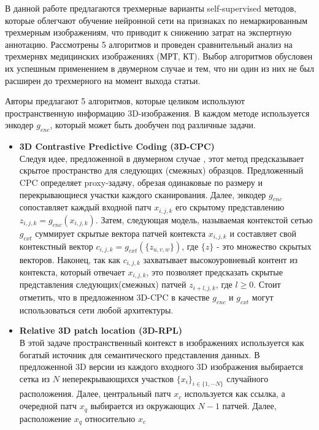 В данной работе \cite{3DSelfSuper} предлагаются трехмерные варианты self-supervised 
методов, которые облегчают обучение нейронной сети на признаках 
по немаркированным трехмерным изображениям, что приводит к снижению
затрат на экспертную аннотацию. Рассмотрены 5 алгоритмов и проведен 
сравнительный анализ на трехмернвх медицинских изображениях (МРТ, КТ).
Выбор алгоритмов обусловен их успешным применением в двумерном случае и тем,
что ни один из них не был расширен до трехмерного на момент выхода статьи.

\par 
Авторы предлагают 5 алгоритмов, которые целиком используют пространственную информацию
3D-изображения. В каждом методе используется энкодер \(g_{enc}\), который 
может быть дообучен под различные задачи.
\begin{itemize}
    \item \textbf{3D Contrastive Predictive Coding (3D-CPC)} \\
    Следуя идее, предложенной в двумерном случае \cite{CPC}, этот метод предсказывает скрытое 
    пространство для следующих (смежных) образцов. Предложенный CPC определяет 
    proxy-задачу, обрезая одинаковые по размеру и перекрывающиеся участки каждого 
    сканирования. Далее, энкодер \(g_{enc}\) сопоставляет каждый входной патч 
    \(x_{i,j,k}\) его скрытому представлению \(z_{i,j,k}= g_{enc}(x_{i,j,k})\). Затем, 
    следующая модель, называемая контекстой сетью \(g_{cxt}\) суммирует скрытые вектора патчей
    контекста \(x_{i,j,k}\) и составляет свой контекстный вектор 
    \(c_{i,j,k}=g_{cxt}(\{z_{u,v,w}\})\), где \(\{z\}\) - это множество скрытых векторов.
    Наконец, так как \(c_{i,j,k}\) захватывает высокоуровневый контент из контекста, который 
    отвечает \(x_{i,j,k}\), это позволяет предсказать скрытые представления следующих(смежных)
    патчей \(z_{i+l,j,k}\), где \(l\geq 0\). Стоит отметить, что в предложенном 3D-CPC
    в качестве \(g_{enc}\) и \(g_{cxt}\) могут использоваться сети любой архитектуры.
    \item \textbf{Relative 3D patch location (3D-RPL)} \\
    В этой задаче пространственный контекст в изображениях используется 
    как богатый источник для семантического представления данных. В предложенной 
    3D версии из каждого входного 3D изображения выбирается сетка из \(N\)
    неперекрывающихся участков \(\{x_{i}\}_{i\in \{1, \cdots N\}}\) случайного расположения. 
    Далее, центральный патч \(x_c\) используется как ссылка, а очередной патч \(x_q\)
    выбирается из окружающих \(N-1\) патчей. Далее, расположение \(x_q\) относительно \(x_c\)

\end{itemize}
